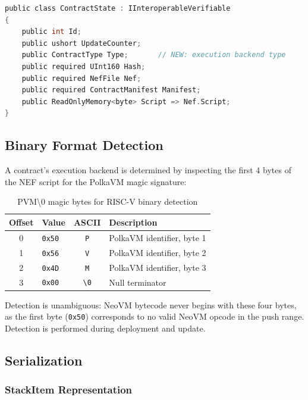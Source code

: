 \documentclass[11pt,a4paper]{article}
\begin{document}
\begin{lstlisting}[language=C, caption={ContractState with Type field}]
public class ContractState : IInteroperableVerifiable
{
    public int Id;
    public ushort UpdateCounter;
    public ContractType Type;       // NEW: execution backend type
    public required UInt160 Hash;
    public required NefFile Nef;
    public required ContractManifest Manifest;
    public ReadOnlyMemory<byte> Script => Nef.Script;
}
\end{lstlisting}

\subsection{Binary Format Detection}

A contract's execution backend is determined by inspecting the first 4 bytes
of the NEF script for the PolkaVM magic signature:

\begin{table}[H]
\centering
\begin{tabular}{clcp{5cm}}
\toprule
\textbf{Offset} & \textbf{Value} & \textbf{ASCII} & \textbf{Description} \\
\midrule
0 & \texttt{0x50} & \texttt{P} & PolkaVM identifier, byte 1 \\
1 & \texttt{0x56} & \texttt{V} & PolkaVM identifier, byte 2 \\
2 & \texttt{0x4D} & \texttt{M} & PolkaVM identifier, byte 3 \\
3 & \texttt{0x00} & \texttt{\textbackslash0} & Null terminator \\
\bottomrule
\end{tabular}
\caption{PVM\textbackslash0 magic bytes for RISC-V binary detection}
\label{tab:magic}
\end{table}

Detection is unambiguous: NeoVM bytecode never begins with these four bytes,
as the first byte (\texttt{0x50}) corresponds to no valid NeoVM opcode in
the push range. Detection is performed during deployment and update.

\subsection{Serialization}

\subsubsection{StackItem Representation}
\end{document}
